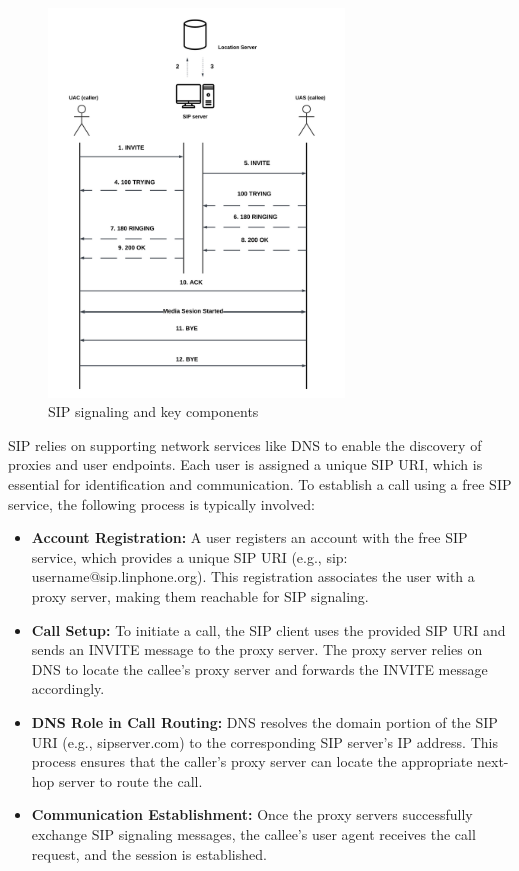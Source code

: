     \begin{figure}[H]
        \centering
        \includegraphics[width=0.7\textwidth, height=0.7\textheight]{image/Call Initiation.png} 
        \caption{SIP signaling and key components}
        \label{fig:sip_signaling}
    \end{figure}
    
    SIP relies on supporting network services like DNS to enable the discovery of proxies and user endpoints. 
    Each user is assigned a unique SIP URI, which is essential for identification and communication. 
    To establish a call using a free SIP service, the following process is typically involved:

    \begin{itemize}
        \item \textbf{Account Registration:} A user registers an account with the free SIP service, which provides a unique SIP URI (e.g., sip: username@sip.linphone.org). 
        This registration associates the user with a proxy server, making them reachable for SIP signaling.
        \item \textbf{Call Setup:} To initiate a call, the SIP client uses the provided SIP URI and sends an INVITE message to the proxy server. 
        The proxy server relies on DNS to locate the callee's proxy server and forwards the INVITE message accordingly.
        \item \textbf{DNS Role in Call Routing:} DNS resolves the domain portion of the SIP URI (e.g., sipserver.com) to the corresponding SIP server's IP address. 
        This process ensures that the caller's proxy server can locate the appropriate next-hop server to route the call.
        \item \textbf{Communication Establishment:}  Once the proxy servers successfully exchange SIP signaling messages, the callee's user agent receives the call request, and the session is established.
    \end{itemize}


